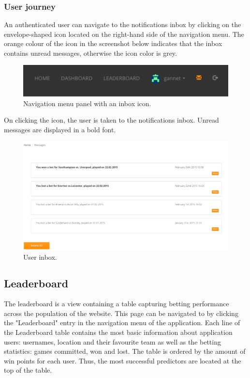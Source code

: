 \subsubsection*{User journey}
\label{subsec:notificationsuserjourney}
An authenticated user can navigate to the notifications inbox by clicking on the envelope-shaped icon located on the right-hand side of the navigation menu. The orange colour of the icon in the screenshot below indicates that the inbox contains unread messages, otherwise the icon color is grey.

\begin{figure}[H]
	\begin{center}
		\includegraphics[width=.90\textwidth]{impl/images/navigationMenu}
		\caption{Navigation menu panel with an inbox icon.} \label{fig:using: navigationmenu}
	\end{center}
\end{figure}

On clicking the icon, the user is taken to the notifications inbox. Unread messages are displayed in a bold font.

\begin{figure}[H]
	\begin{center}
		\includegraphics[width=.90\textwidth]{impl/images/inbox}
		\caption{User inbox.} \label{fig:using: inbox}
	\end{center}
\end{figure}

\subsection{Leaderboard}
\label{subsec:leaderboard}
The leaderboard is a view containing a table capturing betting performance across the population of the website. This page can be navigated to by clicking the "Leaderboard" entry in the navigation menu of the application. Each line of the Leaderboard table contains the most basic information about application users: usernames, location and their favourite team as well as the betting statistics: games committed, won and lost. The table is ordered by the amount of win points for each user. Thus, the most successful predictors are located at the top of the table.

